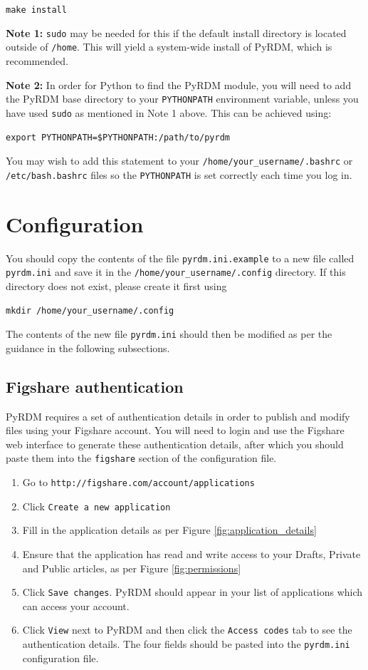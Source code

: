 \documentclass[a4paper,11pt]{report}
\begin{document}
  \texttt{make install}

\textbf{Note 1:} \texttt{sudo} may be needed for this if the default install directory is located outside of \texttt{/home}. This will yield a system-wide install of PyRDM, which is recommended.

\textbf{Note 2:} In order for Python to find the PyRDM module, you will need to add the PyRDM base directory to your \texttt{PYTHONPATH} environment variable, unless you have used \texttt{sudo} as mentioned in Note 1 above. This can be achieved using:

  \texttt{export PYTHONPATH=\$PYTHONPATH:/path/to/pyrdm}

You may wish to add this statement to your \texttt{/home/your\_username/.bashrc} or \texttt{/etc/bash.bashrc} files so the \texttt{PYTHONPATH} is set correctly each time you log in.

\section{Configuration}
You should copy the contents of the file \texttt{pyrdm.ini.example} to a new file called \texttt{pyrdm.ini} and save it in the \texttt{/home/your\_username/.config} directory. If this directory does not exist, please create it first using

  \texttt{mkdir /home/your\_username/.config}

The contents of the new file \texttt{pyrdm.ini} should then be modified as per the guidance in the following subsections.

\subsection{Figshare authentication}\label{sect:authentication}
PyRDM requires a set of authentication details in order to publish and modify files using your Figshare account. You will need to login and use the Figshare web interface to generate these authentication details, after which you should paste them into the \texttt{figshare} section of the configuration file.

\begin{enumerate}
  \item Go to \texttt{http://figshare.com/account/applications}
  \item Click \texttt{Create a new application}
  \item Fill in the application details as per Figure \ref{fig:application_details}
  \item Ensure that the application has read and write access to your Drafts, Private and Public articles, as per Figure \ref{fig:permissions}
  \item Click \texttt{Save changes}. PyRDM should appear in your list of applications which can access your account.
  \item Click \texttt{View} next to PyRDM and then click the \texttt{Access codes} tab to see the authentication details. The four fields should be pasted into the \texttt{pyrdm.ini} configuration file.
\end{enumerate}
\end{document}
